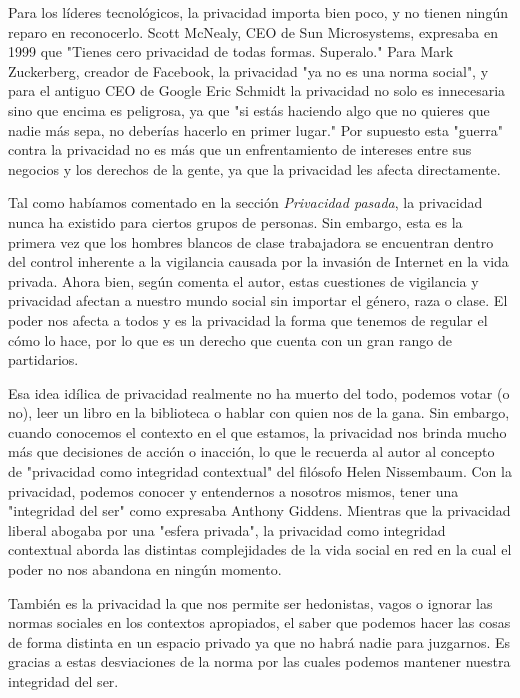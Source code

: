 \documentclass[11pt]{article}
\begin{document}
Para los líderes tecnológicos, la privacidad importa bien poco, y no tienen ningún reparo en reconocerlo. Scott McNealy, CEO de Sun Microsystems, expresaba en 1999 que "Tienes cero privacidad de todas formas. Superalo." Para Mark Zuckerberg, creador de Facebook, la privacidad "ya no es una norma social", y para el antiguo CEO de Google Eric Schmidt la privacidad no solo es innecesaria sino que encima es peligrosa, ya que "si estás haciendo algo que no quieres que nadie más sepa, no deberías hacerlo en primer lugar." Por supuesto esta "guerra" contra la privacidad no es más que un enfrentamiento de intereses entre sus negocios y los derechos de la gente, ya que la privacidad les afecta directamente.

Tal como habíamos comentado en la sección \textit{Privacidad pasada}, la privacidad nunca ha existido para ciertos grupos de personas. Sin embargo, esta es la primera vez que los hombres blancos de clase trabajadora se encuentran dentro del control inherente a la vigilancia causada por la invasión de Internet en la vida privada. Ahora bien, según comenta el autor, estas cuestiones de vigilancia y privacidad afectan a nuestro mundo social sin importar el género, raza o clase. El poder nos afecta a todos y es la privacidad la forma que tenemos de regular el cómo lo hace, por lo que es un derecho que cuenta con un gran rango de partidarios.

Esa idea idílica de privacidad realmente no ha muerto del todo, podemos votar (o no), leer un libro en la biblioteca o hablar con quien nos de la gana. Sin embargo, cuando conocemos el contexto en el que estamos, la privacidad nos brinda mucho más que decisiones de acción o inacción, lo que le recuerda al autor al concepto de "privacidad como integridad contextual" del filósofo Helen Nissembaum. Con la privacidad, podemos conocer y entendernos a nosotros mismos, tener una "integridad del ser" como expresaba Anthony Giddens. Mientras que la privacidad liberal abogaba por una "esfera privada", la privacidad como integridad contextual aborda las distintas complejidades de la vida social en red en la cual el poder no nos abandona en ningún momento.

También es la privacidad la que nos permite ser hedonistas, vagos o ignorar las normas sociales en los contextos apropiados, el saber que podemos hacer las cosas de forma distinta en un espacio privado ya que no habrá nadie para juzgarnos. Es gracias a estas desviaciones de la norma por las cuales podemos mantener nuestra integridad del ser.
\end{document}
